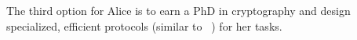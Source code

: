 The third option for Alice is to earn a PhD in cryptography and design
specialized, efficient protocols (similar to
~\cite{shafindss,wu,minionn}) for her tasks.









